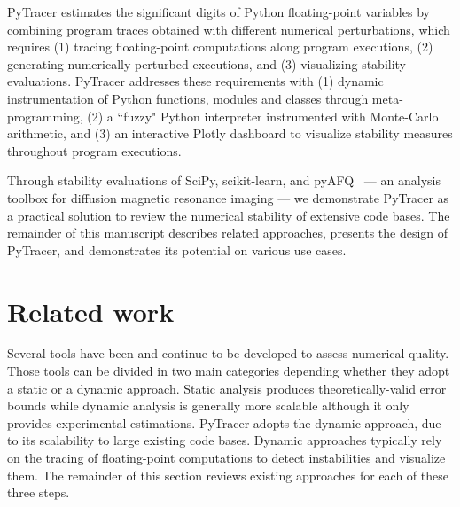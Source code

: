 \documentclass[11pt]{article}
\newcommand{\tristan}[1]{\color{orange}\textbf{From Tristan:} #1\color{black}\xspace}
\newcommand{\pytracer}[0]{PyTracer\xspace}
\begin{document}
PyTracer estimates the significant digits of Python floating-point variables by combining program traces obtained with different numerical perturbations, which requires (1) tracing floating-point computations along program executions, (2) generating numerically-perturbed executions, and (3) visualizing stability evaluations. PyTracer addresses these requirements with (1) dynamic instrumentation of Python functions, modules and classes through meta-programming, (2) a ``fuzzy" Python interpreter instrumented with Monte-Carlo arithmetic, and (3) an interactive Plotly dashboard to visualize stability measures throughout program executions.

Through stability evaluations of 
SciPy, scikit-learn, and pyAFQ~\cite{kruper2021evaluating} --- an analysis toolbox for diffusion magnetic resonance imaging --- we demonstrate PyTracer as a practical solution to review the numerical stability of extensive code bases. The remainder of this manuscript describes related approaches, presents the design of PyTracer, and demonstrates its potential on various use cases.


\section{Related work}

Several tools have been and continue to be developed to assess numerical quality. Those tools can be divided in two main categories depending whether they adopt a static or a dynamic approach.
Static analysis produces theoretically-valid error bounds 
while dynamic analysis is generally more scalable although it only provides experimental estimations.
\pytracer adopts the dynamic approach, due to its scalability to large existing code bases. Dynamic approaches typically rely on the tracing of floating-point computations to detect instabilities and visualize them. The remainder of this section reviews existing approaches for each of these three steps. 
\end{document}
